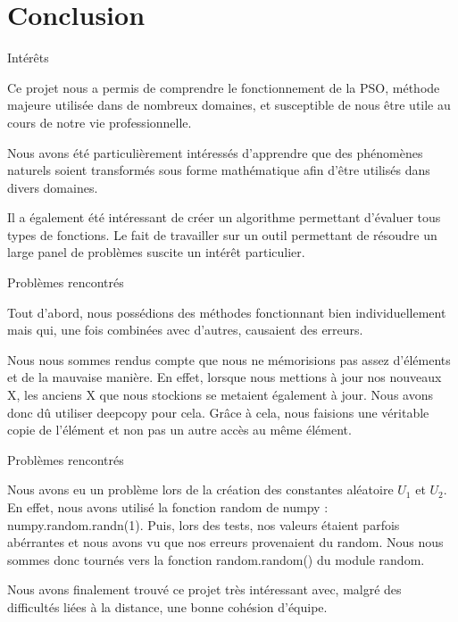 \documentclass{beamer}
\begin{document}
\section{Conclusion}
  \begin{frame}{Intérêts}
    \begin{block}{}
        Ce projet nous a permis de comprendre le fonctionnement de la PSO, méthode majeure utilisée dans de nombreux domaines, et susceptible de nous être utile au cours de notre vie professionnelle.
    \end{block}\pause
    \vspace{0.1 cm}
    \begin{block}{}
      Nous avons été particulièrement intéressés d’apprendre que des phénomènes naturels soient transformés sous forme mathématique afin d’être utilisés dans divers domaines.
    \end{block}\pause
    \vspace{0.1 cm}
    \begin{block}{}
      Il a également été intéressant de créer un algorithme permettant d’évaluer tous types de fonctions. Le fait de travailler sur un outil permettant de résoudre un large panel de problèmes suscite un intérêt particulier. 
    \end{block}
  \end{frame}

  \begin{frame}{Problèmes rencontrés}
    \begin{block}{}
      Tout d’abord, nous possédions des méthodes fonctionnant bien individuellement mais qui, une fois combinées avec d’autres, causaient des erreurs. 
    \end{block}\pause
    \vspace{0.1 cm}
    \begin{block}{}
      Nous nous sommes rendus compte que nous ne mémorisions pas assez d'éléments et de la mauvaise manière. En effet, lorsque nous mettions à jour nos nouveaux X, les anciens X que nous stockions se metaient également à jour. Nous avons donc dû utiliser deepcopy pour cela. Grâce à cela, nous faisions une véritable copie de l'élément et non pas un autre accès au même élément.
    \end{block}
  \end{frame}

  \begin{frame}{Problèmes rencontrés}
    \begin{block}{}
      Nous avons eu un problème lors de la création des constantes aléatoire $U_1$ et $U_2$. En effet, nous avons utilisé la fonction random de numpy : numpy.random.randn(1). Puis, lors des tests, nos valeurs étaient parfois abérrantes et nous avons vu que nos erreurs provenaient du random. Nous nous sommes donc tournés vers la fonction random.random() du module random.
    \end{block}\pause
    \begin{block}{}
      Nous avons finalement trouvé ce projet très intéressant avec, malgré des difficultés liées à la distance, une bonne cohésion d’équipe. 
    \end{block}
  \end{frame}
\end{document}
